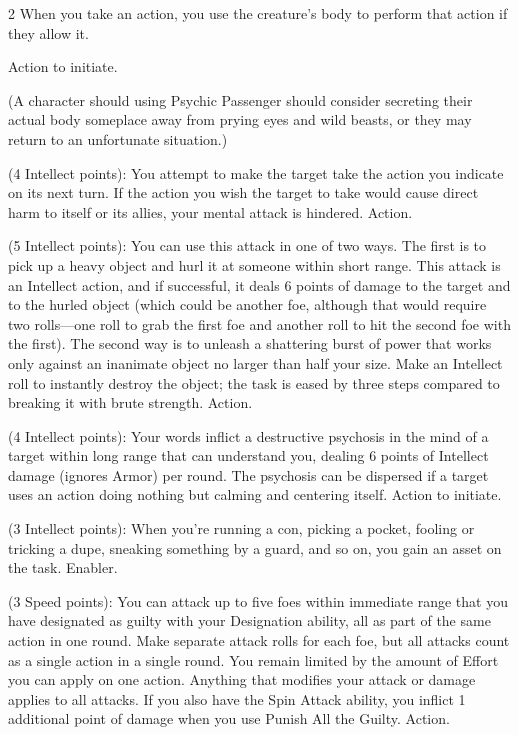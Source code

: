 \begin{multicols}{2}
When you take an action, you use the creature’s body to perform that action if they allow it. 

Action to initiate. 

(A character should using Psychic Passenger should consider secreting their actual body someplace away from prying eyes and wild beasts, or they may return to an unfortunate situation.)
 
 (4 Intellect points): You attempt to make the target take the action you indicate on its next turn. If the action you wish the target to take would cause direct harm to itself or its allies, your mental attack is hindered. Action. 
 
 (5 Intellect points): You can use this attack in one of two ways. The first is to pick up a heavy object and hurl it at someone within short range. This attack is an Intellect action, and if successful, it deals 6 points of damage to the target and to the hurled object (which could be another foe, although that would require two rolls—one roll to grab the first foe and another roll to hit the second foe with the first). The second way is to unleash a shattering burst of power that works only against an inanimate object no larger than half your size. Make an Intellect roll to instantly destroy the object; the task is eased by three steps compared to breaking it with brute strength. Action. 
 
 (4 Intellect points): Your words inflict a destructive psychosis in the mind of a target within long range that can understand you, dealing 6 points of Intellect damage (ignores Armor) per round. The psychosis can be dispersed if a target uses an action doing nothing but calming and centering itself. Action to initiate. 
 
 (3 Intellect points): When you’re running a con, picking a pocket, fooling or tricking a dupe, sneaking something by a guard, and so on, you gain an asset on the task. Enabler. 
 
 (3 Speed points): You can attack up to five foes within immediate range that you have designated as guilty with your Designation ability, all as part of the same action in one round. Make separate attack rolls for each foe, but all attacks count as a single action in a single round. You remain limited by the amount of Effort you can apply on one action. Anything that modifies your attack or damage applies to all attacks. If you also have the Spin Attack ability, you inflict 1 additional point of damage when you use Punish All the Guilty. Action. 
 

\end{multicols}
